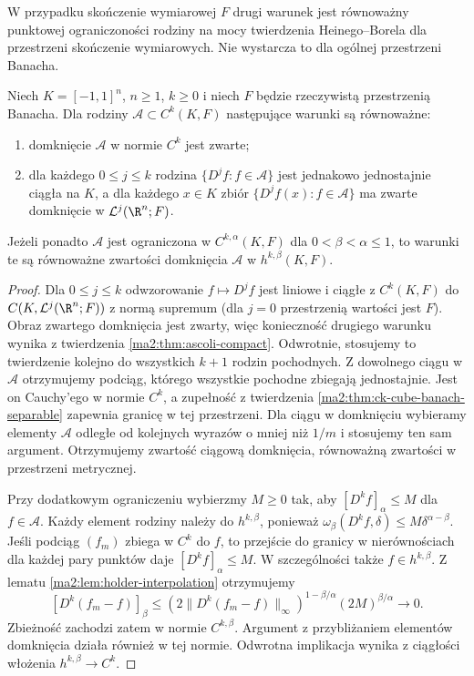 W przypadku skończenie wymiarowej $F$ drugi
warunek jest równoważny punktowej ograniczoności
rodziny na mocy twierdzenia Heinego--Borela
dla przestrzeni skończenie wymiarowych.
Nie wystarcza to dla ogólnej przestrzeni Banacha.

\begin{stwierdzenie}
\label{ma2:prop:compact-derivative-criteria}
Niech $K=[-1,1]^n$, $n\ge1$, $k\ge0$ i niech
$F$ będzie rzeczywistą przestrzenią Banacha.
Dla rodziny $\mathcal A\subset C^k(K,F)$
następujące warunki są równoważne:
\begin{enumerate}
 \item domknięcie $\mathcal A$ w normie $C^k$ jest zwarte;
 \item dla każdego $0\le j\le k$ rodzina
 $\{D^jf:f\in\mathcal A\}$ jest jednakowo jednostajnie
 ciągła na $K$, a dla każdego $x\in K$
 zbiór $\{D^jf(x):f\in\mathcal A\}$ ma zwarte
 domknięcie w $\mathcal L^j(\R^n;F)$.
\end{enumerate}
Jeżeli ponadto $\mathcal A$ jest ograniczona
w $C^{k,\alpha}(K,F)$ dla $0<\beta<\alpha\le1$,
to warunki te są równoważne zwartości domknięcia
$\mathcal A$ w $h^{k,\beta}(K,F)$.
\end{stwierdzenie}
\begin{proof}
Dla $0\le j\le k$ odwzorowanie $f\mapsto D^jf$
jest liniowe i ciągłe z $C^k(K,F)$ do
$C(K,\mathcal L^j(\R^n;F))$ z normą supremum
(dla $j=0$ przestrzenią wartości jest $F$).
Obraz zwartego domknięcia jest zwarty, więc
konieczność drugiego warunku wynika z twierdzenia
\ref{ma2:thm:ascoli-compact}.
Odwrotnie, stosujemy to twierdzenie kolejno
do wszystkich $k+1$ rodzin pochodnych.
Z dowolnego ciągu w $\mathcal A$ otrzymujemy
podciąg, którego wszystkie pochodne zbiegają
jednostajnie. Jest on Cauchy'ego w normie $C^k$,
a zupełność z twierdzenia
\ref{ma2:thm:ck-cube-banach-separable}
zapewnia granicę w tej przestrzeni.
Dla ciągu w domknięciu wybieramy elementy
$\mathcal A$ odległe od kolejnych wyrazów
o mniej niż $1/m$ i stosujemy ten sam argument.
Otrzymujemy zwartość ciągową domknięcia,
równoważną zwartości w przestrzeni metrycznej.

Przy dodatkowym ograniczeniu wybierzmy $M\ge0$
tak, aby $[D^kf]_\alpha\le M$ dla $f\in\mathcal A$.
Każdy element rodziny należy do $h^{k,\beta}$,
ponieważ $\omega_\beta(D^kf,\delta)
\le M\delta^{\alpha-\beta}$.
Jeśli podciąg $(f_m)$ zbiega w $C^k$ do $f$,
to przejście do granicy w nierównościach dla
każdej pary punktów daje $[D^kf]_\alpha\le M$.
W szczególności także $f\in h^{k,\beta}$.
Z lematu \ref{ma2:lem:holder-interpolation}
otrzymujemy
\[
 [D^k(f_m-f)]_\beta
 \le (2\|D^k(f_m-f)\|_\infty)^{1-\beta/\alpha}
       (2M)^{\beta/\alpha}\longrightarrow0.
\]
Zbieżność zachodzi zatem w normie $C^{k,\beta}$.
Argument z przybliżaniem elementów domknięcia
działa również w tej normie. Odwrotna implikacja
wynika z ciągłości włożenia $h^{k,\beta}\to C^k$.
\end{proof}

